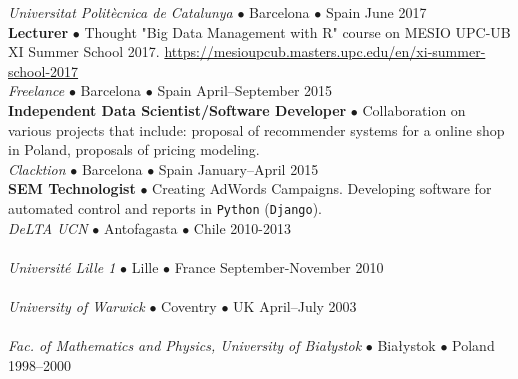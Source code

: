 \documentclass[a4paper, oneside]{scrreprt}
\begin{document}
\noindent{}\textit{Universitat Politècnica de Catalunya} $\bullet$ 
Barcelona $\bullet$ Spain \hfill June 2017\\
\noindent\textbf{\small Lecturer} $\bullet$ Thought "Big Data Management with R" course on MESIO UPC-UB XI Summer School 2017.
\href{https://mesioupcub.masters.upc.edu/en/xi-summer-school-2017}{https://mesioupcub.masters.upc.edu/en/xi-summer-school-2017}\\
\noindent{}\textit{Freelance} $\bullet$ 
Barcelona $\bullet$ Spain \hfill April--September 2015\\
\noindent\textbf{\small Independent Data Scientist/Software Developer} $\bullet$ Collaboration on various projects that include: proposal of recommender systems for a
online shop in Poland, proposals of pricing modeling. \\
\noindent{}\textit{Clacktion} $\bullet$ 
Barcelona $\bullet$ Spain \hfill January--April 2015\\
\noindent\textbf{\small SEM Technologist} $\bullet$ Creating AdWords Campaigns.
Developing software for automated control and reports in \texttt{Python} (\texttt{Django}).\\ 
\noindent{}\textit{DeLTA UCN} $\bullet$ 
Antofagasta $\bullet$ Chile \hfill 2010-2013\\
\\
\noindent{}\textit{Universit{\'e} Lille 1} $\bullet$ Lille $\bullet$ France \hfill September-November 2010\\
\\
\noindent{}\textit{University of Warwick} 
$\bullet$ Coventry $\bullet$ UK \hfill April–July 2003\\
\\
\noindent{}\textit{Fac. of Mathematics and Physics, University
  of Bia{\l}ystok} $\bullet$  Bia{\l}ystok $\bullet$ Poland \hfill 1998--2000\\ 
\\
\end{document}
